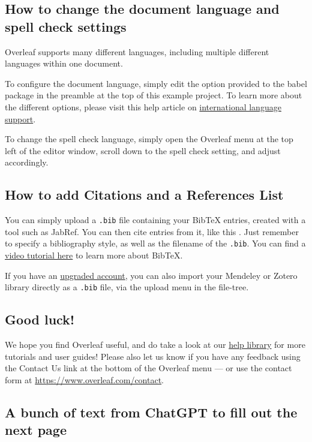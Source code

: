 \documentclass[twocolumn, 9pt]{extarticle}
\begin{document}
\subsection{How to change the document language and spell check settings}

Overleaf supports many different languages, including multiple different languages within one document. 

To configure the document language, simply edit the option provided to the babel package in the preamble at the top of this example project. To learn more about the different options, please visit this help article on \href{https://www.overleaf.com/learn/latex/International_language_support}{international language support}.

To change the spell check language, simply open the Overleaf menu at the top left of the editor window, scroll down to the spell check setting, and adjust accordingly.

\subsection{How to add Citations and a References List}

You can simply upload a \verb|.bib| file containing your BibTeX entries, created with a tool such as JabRef. You can then cite entries from it, like this \cite{greenwade93}. Just remember to specify a bibliography style, as well as the filename of the \verb|.bib|. You can find a \href{https://www.overleaf.com/help/97-how-to-include-a-bibliography-using-bibtex}{video tutorial here} to learn more about BibTeX.

If you have an \href{https://www.overleaf.com/user/subscription/plans}{upgraded account}, you can also import your Mendeley or Zotero library directly as a \verb|.bib| file, via the upload menu in the file-tree.

\subsection{Good luck!}

We hope you find Overleaf useful, and do take a look at our \href{https://www.overleaf.com/learn}{help library} for more tutorials and user guides! Please also let us know if you have any feedback using the Contact Us link at the bottom of the Overleaf menu --- or use the contact form at \url{https://www.overleaf.com/contact}.


\subsection{A bunch of text from ChatGPT to fill out the next page}
\end{document}
